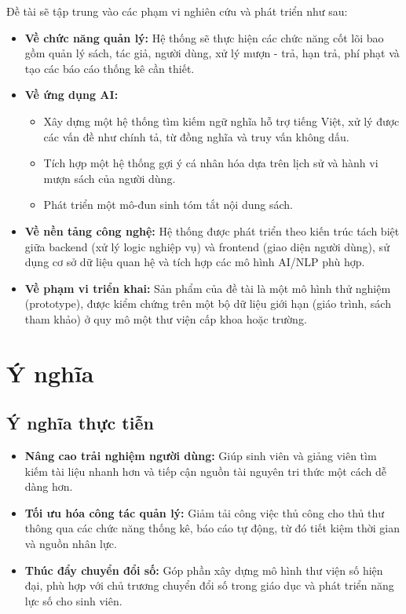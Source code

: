 Đề tài sẽ tập trung vào các phạm vi nghiên cứu và phát triển như sau:
\begin{itemize}
    \item \textbf{Về chức năng quản lý:} Hệ thống sẽ thực hiện các chức năng cốt lõi bao gồm quản lý sách, tác giả, người dùng, xử lý mượn - trả, hạn trả, phí phạt và tạo các báo cáo thống kê cần thiết.
    
    \item \textbf{Về ứng dụng AI:}
    \begin{itemize}
        \item Xây dựng một hệ thống tìm kiếm ngữ nghĩa hỗ trợ tiếng Việt, xử lý được các vấn đề như chính tả, từ đồng nghĩa và truy vấn không dấu.
        \item Tích hợp một hệ thống gợi ý cá nhân hóa dựa trên lịch sử và hành vi mượn sách của người dùng.
        \item Phát triển một mô-đun sinh tóm tắt nội dung sách.
    \end{itemize}
    
    \item \textbf{Về nền tảng công nghệ:} Hệ thống được phát triển theo kiến trúc tách biệt giữa backend (xử lý logic nghiệp vụ) và frontend (giao diện người dùng), sử dụng cơ sở dữ liệu quan hệ và tích hợp các mô hình AI/NLP phù hợp.
    
    \item \textbf{Về phạm vi triển khai:} Sản phẩm của đề tài là một mô hình thử nghiệm (prototype), được kiểm chứng trên một bộ dữ liệu giới hạn (giáo trình, sách tham khảo) ở quy mô một thư viện cấp khoa hoặc trường.
\end{itemize}

\section{Ý nghĩa}
\label{sec:YNghia}

\subsection{Ý nghĩa thực tiễn}
\label{subsec:YNghiaThucTien}
\begin{itemize}
    \item \textbf{Nâng cao trải nghiệm người dùng:} Giúp sinh viên và giảng viên tìm kiếm tài liệu nhanh hơn và tiếp cận nguồn tài nguyên tri thức một cách dễ dàng hơn.
    \item \textbf{Tối ưu hóa công tác quản lý:} Giảm tải công việc thủ công cho thủ thư thông qua các chức năng thống kê, báo cáo tự động, từ đó tiết kiệm thời gian và nguồn nhân lực.
    \item \textbf{Thúc đẩy chuyển đổi số:} Góp phần xây dựng mô hình thư viện số hiện đại, phù hợp với chủ trương chuyển đổi số trong giáo dục và phát triển năng lực số cho sinh viên.
\end{itemize}

